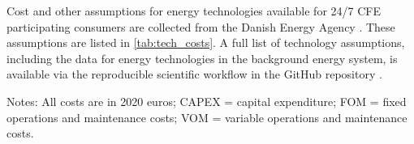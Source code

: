 %


Cost and other assumptions for energy technologies available for 24/7 CFE participating consumers are collected from the Danish Energy Agency \cite{DEA-technologydata}. These assumptions are listed in \cref{tab:tech_costs}.
A full list of technology assumptions, including the data for energy technologies in the background energy system, is available via the reproducible scientific workflow in the GitHub repository \cite{github-spacetime}.

\begin{table*}[t]
    \centering
\begin{tablenotes}
    {\footnotesize
    \item[] Notes: All costs are in 2020 euros; CAPEX = capital expenditure; FOM = fixed operations and maintenance costs; VOM = variable operations and maintenance costs.
    }
\end{tablenotes}
    \vspace{0.2cm}
    \caption{Technology assumptions.}
    \label{tab:tech_costs}
\end{table*}
